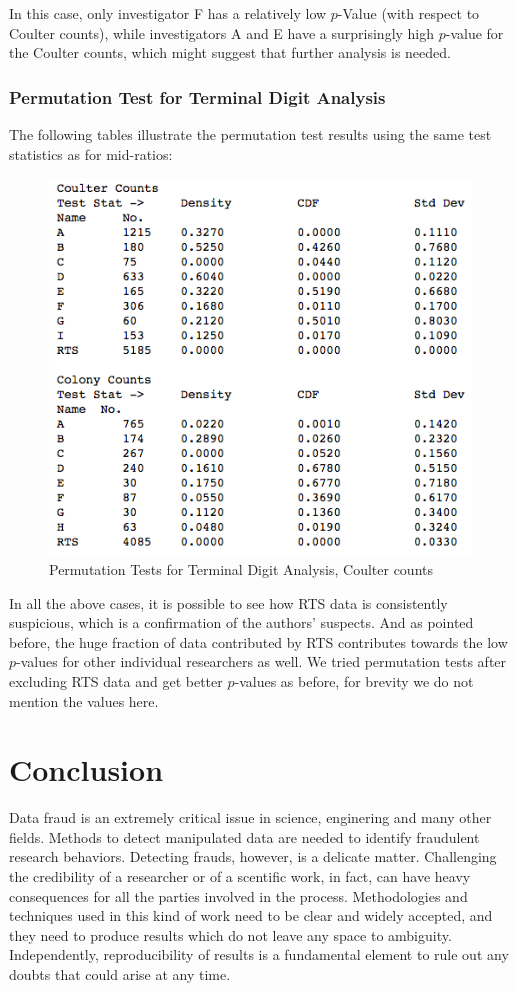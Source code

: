 \documentclass{article}
\begin{document}
In this case, only investigator F has a relatively low $p$-Value (with respect to
Coulter counts), while investigators A and E have a surprisingly high
$p$-value for the Coulter counts, which might suggest that further
analysis is needed.

    \subsubsection{Permutation Test for Terminal Digit
Analysis}\label{permutation-test-for-terminal-digit-analysis}

The following tables illustrate the permutation test results using the
same test statistics as for mid-ratios:

\begin{figure}[H]
\centering
\includegraphics[width=0.7\linewidth]{images/raaz_eq_perm_summary.png}
\caption{Permutation Tests for Terminal Digit Analysis, Coulter counts}
\end{figure}

In all the above cases, it is possible to see how RTS data is
consistently suspicious, which is a confirmation of the authors'
suspects. And as pointed before, the huge fraction of data contributed
by RTS contributes towards the low $p$-values for other individual
researchers as well. We tried permutation tests after excluding RTS data
and get better $p$-values as before, for brevity we do not mention the
values here.

    \section{Conclusion}\label{conclusion}

    Data fraud is an extremely critical issue in science, enginering and
many other fields. Methods to detect manipulated data are needed to
identify fraudulent research behaviors. Detecting frauds, however, is a
delicate matter. Challenging the credibility of a researcher or of a
scentific work, in fact, can have heavy consequences for all the parties
involved in the process. Methodologies and techniques used in this kind
of work need to be clear and widely accepted, and they need to produce
results which do not leave any space to ambiguity. Independently, reproducibility of
results is a fundamental element to rule out any doubts that could arise
at any time.
\end{document}

